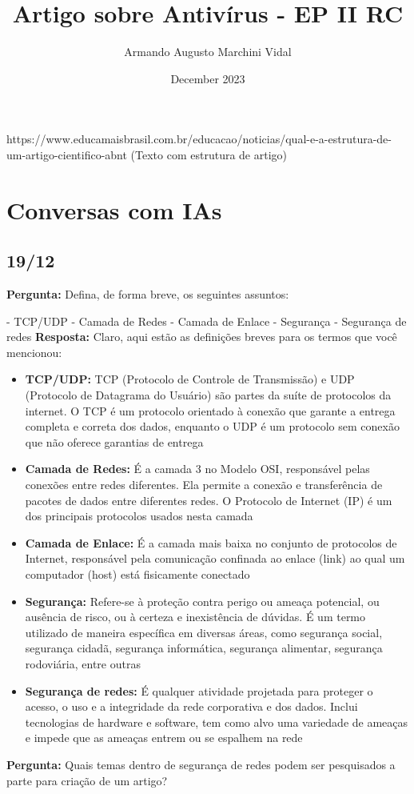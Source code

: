 \documentclass{article}
\title{Artigo sobre Antivírus - EP II RC}
\author{Armando Augusto Marchini Vidal}
\date{December 2023}
\begin{document}
https://www.educamaisbrasil.com.br/educacao/noticias/qual-e-a-estrutura-de-um-artigo-cientifico-abnt (Texto com estrutura de artigo)
\newpage
\maketitle

\section{Conversas com IAs}
\subsection{19/12}
\textbf{Pergunta:}\newline
Defina, de forma breve, os seguintes assuntos:

- TCP/UDP\newline
- Camada de Redes\newline
- Camada de Enlace\newline
- Segurança\newline
- Segurança de redes\newline
\textbf{Resposta:}\newline
Claro, aqui estão as definições breves para os termos que você mencionou:\newline
\begin{itemize}
    \item \textbf{TCP/UDP:} TCP (Protocolo de Controle de Transmissão) e UDP (Protocolo de Datagrama do Usuário) são partes da suíte de protocolos da internet. O TCP é um protocolo orientado à conexão que garante a entrega completa e correta dos dados, enquanto o UDP é um protocolo sem conexão que não oferece garantias de entrega
    \item \textbf{Camada de Redes:} É a camada 3 no Modelo OSI, responsável pelas conexões entre redes diferentes. Ela permite a conexão e transferência de pacotes de dados entre diferentes redes. O Protocolo de Internet (IP) é um dos principais protocolos usados nesta camada
    \item \textbf{Camada de Enlace:} É a camada mais baixa no conjunto de protocolos de Internet, responsável pela comunicação confinada ao enlace (link) ao qual um computador (host) está fisicamente conectado
    \item \textbf{Segurança:} Refere-se à proteção contra perigo ou ameaça potencial, ou ausência de risco, ou à certeza e inexistência de dúvidas. É um termo utilizado de maneira específica em diversas áreas, como segurança social, segurança cidadã, segurança informática, segurança alimentar, segurança rodoviária, entre outras
    \item \textbf{Segurança de redes:} É qualquer atividade projetada para proteger o acesso, o uso e a integridade da rede corporativa e dos dados. Inclui tecnologias de hardware e software, tem como alvo uma variedade de ameaças e impede que as ameaças entrem ou se espalhem na rede
\end{itemize}
\textbf{Pergunta:}\newline
Quais temas dentro de segurança de redes podem ser pesquisados a parte para criação de um artigo?\newline
\end{document}
